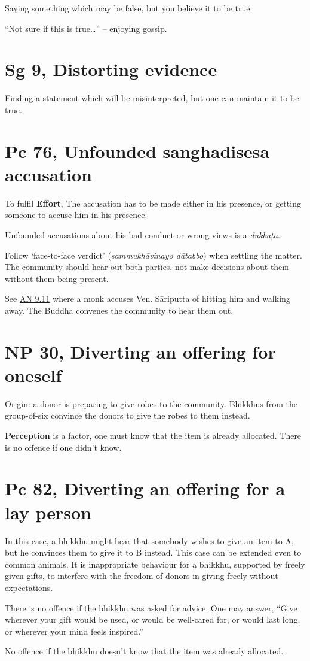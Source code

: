 Saying something which may be false, but you believe it to be true.

``Not sure if this is true\ldots{}'' -- enjoying gossip.

\section{Sg 9, Distorting evidence}

Finding a statement which will be misinterpreted, but one can maintain
it to be true.

\section{Pc 76, Unfounded sanghadisesa accusation}

To fulfil \textbf{Effort}, The accusation has to be made either in his
presence, or getting someone to accuse him in his presence.

Unfounded accusations about his bad conduct or wrong views is a
\emph{dukkaṭa}.

Follow `face-to-face verdict' (\emph{sammukhāvinayo dātabbo}) when
settling the matter. The community should hear out both parties, not
make decisions about them without them being present.

See \href{https://suttacentral.net/an9.11/en/sujato}{AN 9.11} where a
monk accuses Ven. Sāriputta of hitting him and walking away. The Buddha
convenes the community to hear them out.

\section{NP 30, Diverting an offering for oneself}

Origin: a donor is preparing to give robes to the community. Bhikkhus
from the group-of-six convince the donors to give the robes to them
instead.

\textbf{Perception} is a factor, one must know that the item is already
allocated. There is no offence if one didn't know.

\section{Pc 82, Diverting an offering for a lay person}

In this case, a bhikkhu might hear that somebody wishes to give an item
to A, but he convinces them to give it to B instead. This case can be
extended even to common animals. It is inappropriate behaviour for a
bhikkhu, supported by freely given gifts, to interfere with the freedom
of donors in giving freely without expectations.

There is no offence if the bhikkhu was asked for advice. One may answer,
``Give wherever your gift would be used, or would be well-cared for, or
would last long, or wherever your mind feels inspired.''

No offence if the bhikkhu doesn't know that the item was already
allocated.

